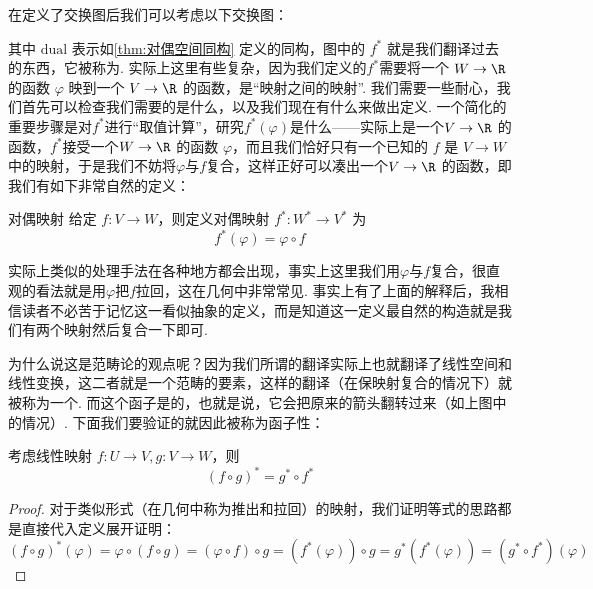 在定义了交换图后我们可以考虑以下交换图：
\begin{center}
\end{center}
其中 $\text{dual}$ 表示如\autoref{thm:对偶空间同构} 定义的同构，图中的 $f^*$ 就是我们翻译过去的东西，它被称为. 实际上这里有些复杂，因为我们定义的$f^*$需要将一个 $W \to \R$ 的函数 $\varphi$ 映到一个 $V \to \R$ 的函数，是``映射之间的映射''. 我们需要一些耐心，我们首先可以检查我们需要的是什么，以及我们现在有什么来做出定义. 一个简化的重要步骤是对$f^*$进行``取值计算''，研究$f^*(\varphi)$是什么——实际上是一个$V \to \R$ 的函数，$f^*$接受一个$W \to \R$ 的函数 $\varphi$，而且我们恰好只有一个已知的 $f$ 是 $V\to W$ 中的映射，于是我们不妨将$\varphi$与$f$复合，这样正好可以凑出一个$V \to \R$ 的函数，即我们有如下非常自然的定义：
\begin{definition}{}{对偶映射}
    给定 $f\colon V \to W$，则定义对偶映射 $f^*: W^* \to V^*$ 为
    \[f^*(\varphi) = \varphi \circ f\]
\end{definition}
实际上类似的处理手法在各种地方都会出现，事实上这里我们用$\varphi$与$f$复合，很直观的看法就是用$\varphi$把$f$拉回，这在几何中非常常见. 事实上有了上面的解释后，我相信读者不必苦于记忆这一看似抽象的定义，而是知道这一定义最自然的构造就是我们有两个映射然后复合一下即可.

为什么说这是范畴论的观点呢？因为我们所谓的翻译实际上也就翻译了线性空间和线性变换，这二者就是一个范畴的要素，这样的翻译（在保映射复合的情况下）就被称为一个. 而这个函子是的，也就是说，它会把原来的箭头翻转过来（如上图中的情况）. 下面我们要验证的就因此被称为函子性：

\begin{lemma}{}{}
    考虑线性映射 $f\colon U \to V, g: V \to W$，则
    \[
        (f \circ g)^* = g^* \circ f^*
    \]
\end{lemma}

\begin{proof}
    对于类似形式（在几何中称为推出和拉回）的映射，我们证明等式的思路都是直接代入定义展开证明：
    \[
        (f \circ g)^* (\varphi) = \varphi \circ (f \circ g) = (\varphi \circ f) \circ g = (f^*(\varphi)) \circ g = g^* (f^*(\varphi)) = (g^* \circ f^*)(\varphi)
    \]
\end{proof}

